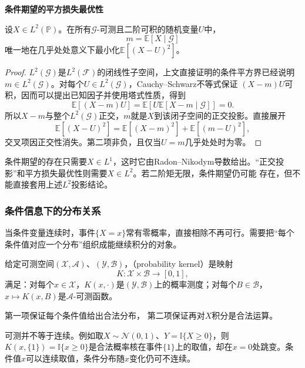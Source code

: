 \par\medskip\noindent\textbf{条件期望的平方损失最优性}\quad
\begin{theorem}[条件均值的平方损失最优性]
\label{thm:probability-conditional-mean-l2-projection}
设\(X\in L^2(\mathbb{P})\)。在所有\(\mathcal{G}\)-可测且二阶可积的随机变量\(U\)中，
\[ m=\mathbb{E}[X\mid\mathcal{G}] \]
唯一地在几乎处处意义下最小化\(\mathbb{E}[(X-U)^2]\)。
\end{theorem}

\begin{proof}
\(L^2(\mathcal{G})\)是\(L^2(\mathcal{F})\)的闭线性子空间，上文直接证明的条件平方界已经说明
\(m\in L^2(\mathcal{G})\)。对每个\(U\in L^2(\mathcal{G})\)，Cauchy--Schwarz不等式保证
\((X-m)U\)可积，因而可以提出已知因子并使用塔式性质，得到
\[ \mathbb{E}[(X-m)U]
  =\mathbb{E}\left[U\mathbb{E}[X-m\mid\mathcal{G}]\right]=0. \]
所以\(X-m\)与整个\(L^2(\mathcal{G})\)正交，\(m\)就是\(X\)到该闭子空间的正交投影。直接展开
\begin{equation}
  \mathbb{E}[(X-U)^2]
  =
  \mathbb{E}[(X-m)^2]
  +
  \mathbb{E}[(m-U)^2],
  \label{eq:probability-pythagorean-prediction}
\end{equation}
交叉项因正交性消失。第二项非负，且仅当\(U=m\)几乎处处时为零。
\end{proof}

条件期望的存在只需要\(X\in L^1\)，这时它由Radon--Nikodym导数给出。“正交投影”和平方损失最优性则需要\(X\in L^2\)。若二阶矩无限，条件期望仍可能
存在，但不能直接套用上述\(L^2\)投影结论。


\subsubsection{条件信息下的分布关系}
\label{sec:rv-conditional-distribution}
当条件变量连续时，事件\(\{X=x\}\)常有零概率，直接相除不再可行。需要把“每个条件值对应一个分布”组织成能继续积分的对象。
\begin{definition}[概率核]
  \label{def:probability-kernel}
  给定可测空间\((\mathcal X,\mathcal A)\)、\((\mathcal Y,\mathcal B)\)，（probability kernel）是映射
  \[ K:\mathcal X\times\mathcal B\to[0,1], \]
  满足：对每个\(x\in\mathcal X\)，\(K(x,\cdot)\)是\((\mathcal Y,\mathcal B)\)上的概率测度；对每个\(B\in\mathcal B\)，\(x\mapsto K(x,B)\)是\(\mathcal A\)-可测函数。
\end{definition}
第一项保证每个条件值给出合法分布，
第二项保证再对\(X\)积分是合法运算。

可测并不等于连续。例如取\(X\sim\mathcal N(0,1)\)、\(Y=\mathbb I\{X\geq0\}\)，则\(K(x,\{1\})=\mathbb I\{x\geq0\}\)是合法概率核在事件\(\{1\}\)上的取值，却在\(x=0\)处跳变。条件值\(x\)可以连续取值，条件分布随\(x\)变化仍可不连续。

